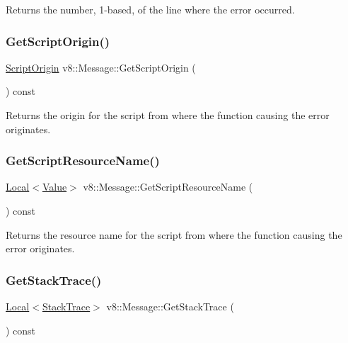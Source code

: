 Returns the number, 1-\/based, of the line where the error occurred. \mbox{\label{classv8_1_1Message_a3530ffb45b802c46a47349e610402a3c}} 
\subsubsection{\texorpdfstring{Get\+Script\+Origin()}{GetScriptOrigin()}}
{\footnotesize\ttfamily \mbox{\hyperlink{classv8_1_1ScriptOrigin}{Script\+Origin}} v8\+::\+Message\+::\+Get\+Script\+Origin (\begin{DoxyParamCaption}{ }\end{DoxyParamCaption}) const}

Returns the origin for the script from where the function causing the error originates. \mbox{\label{classv8_1_1Message_a843084f6838bd58d5fd888ab460cb2d4}} 
\subsubsection{\texorpdfstring{Get\+Script\+Resource\+Name()}{GetScriptResourceName()}}
{\footnotesize\ttfamily \mbox{\hyperlink{classv8_1_1Local}{Local}}$<$\mbox{\hyperlink{classv8_1_1Value}{Value}}$>$ v8\+::\+Message\+::\+Get\+Script\+Resource\+Name (\begin{DoxyParamCaption}{ }\end{DoxyParamCaption}) const}

Returns the resource name for the script from where the function causing the error originates. \mbox{\label{classv8_1_1Message_a4b10ab26bf81c74301bcd93750fd077e}} 
\subsubsection{\texorpdfstring{Get\+Stack\+Trace()}{GetStackTrace()}}
{\footnotesize\ttfamily \mbox{\hyperlink{classv8_1_1Local}{Local}}$<$\mbox{\hyperlink{classv8_1_1StackTrace}{Stack\+Trace}}$>$ v8\+::\+Message\+::\+Get\+Stack\+Trace (\begin{DoxyParamCaption}{ }\end{DoxyParamCaption}) const}

